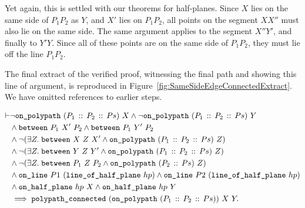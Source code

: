Yet again, this is settled with our theorems for half-planes. Since $X$ lies on the same side of $P_1P_2$ as $Y$, and $X'$ lies on $P_1P_2$, all points on the segment $XX''$ must also lie on the same side. The same argument applies to the segment $X''Y'$, and finally to $Y'Y$. Since all of these points are on the same side of $P_1P_2$, they must lie off the line $P_1P_2$. 

The final extract of the verified proof, witnessing the final path and showing this line of argument, is reproduced in Figure~\ref{fig:SameSideEdgeConnectedExtract}. We have omitted references to earlier steps.

\begin{equation}
  \label{eq:SameSideEdgeConnected}
  \begin{split}
\vdash &\neg\texttt{on\_polypath}\ (P_1\,::\,P_2\,::\,Ps)\ X \wedge\neg\texttt{on\_polypath}\ (P_1\,::\,P_2\,::\,Ps)\ Y\\
    &\wedge\texttt{between}\ P_1\ X'\ P_2\wedge\texttt{between}\ P_1\ Y'\ P_2\\
    &\wedge\neg(\exists Z.\; \texttt{between}\ X\ Z\ X' \wedge \texttt{on\_polypath}\ (P_1\,::\,P_2\,::\,Ps)\ Z)\\
    &\wedge\neg(\exists Z.\; \texttt{between}\ Y\ Z\ Y' \wedge \texttt{on\_polypath}\ (P_1\,::\,P_2\,::\,Ps)\ Z)\\
    &\wedge\neg(\exists Z.\; \texttt{between}\ P_1\ Z\ P_2 \wedge \texttt{on\_polypath}\ (P_2\,::\,Ps)\ Z)\\
    &\wedge \texttt{on\_line}\ P1\ (\texttt{line\_of\_half\_plane}\ hp) \wedge \texttt{on\_line}\ P2\ (\texttt{line\_of\_half\_plane}\ hp)\\
    &\wedge \texttt{on\_half\_plane}\ hp\ X \wedge \texttt{on\_half\_plane}\ hp\ Y\\
    &\implies \texttt{polypath\_connected}\ (\texttt{on\_polypath}\ (P_1\,::\,P_2\,::\,Ps))\ X\ Y.
  \end{split}
\end{equation}

